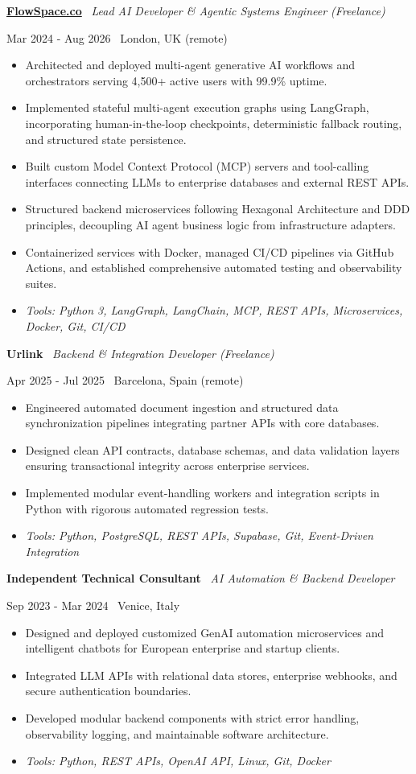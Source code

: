 \documentclass[a4paper,10pt]{article}
\newcommand{\role}[4]{%
  \vspace{2pt}\noindent
  \begin{minipage}[t]{0.70\textwidth}\raggedright\textbf{#1} \textbullet\ \textit{#3}\end{minipage}%
  \hfill
  \begin{minipage}[t]{0.28\textwidth}\raggedleft\footnotesize\color{gray}#2 \textbullet\ #4\end{minipage}%
  \vspace{1pt}%
}
\begin{document}
\role{\href{https://flowspace.co}{FlowSpace.co}}{Mar 2024 - Aug 2026}{Lead AI Developer \& Agentic Systems Engineer (Freelance)}{London, UK (remote)}
\begin{itemize}
  \item Architected and deployed multi-agent generative AI workflows and orchestrators serving 4,500+ active users with 99.9\% uptime.
  \item Implemented stateful multi-agent execution graphs using LangGraph, incorporating human-in-the-loop checkpoints, deterministic fallback routing, and structured state persistence.
  \item Built custom Model Context Protocol (MCP) servers and tool-calling interfaces connecting LLMs to enterprise databases and external REST APIs.
  \item Structured backend microservices following Hexagonal Architecture and DDD principles, decoupling AI agent business logic from infrastructure adapters.
  \item Containerized services with Docker, managed CI/CD pipelines via GitHub Actions, and established comprehensive automated testing and observability suites.
  \item \textit{Tools: Python 3, LangGraph, LangChain, MCP, REST APIs, Microservices, Docker, Git, CI/CD}
\end{itemize}

\role{Urlink}{Apr 2025 - Jul 2025}{Backend \& Integration Developer (Freelance)}{Barcelona, Spain (remote)}
\begin{itemize}
  \item Engineered automated document ingestion and structured data synchronization pipelines integrating partner APIs with core databases.
  \item Designed clean API contracts, database schemas, and data validation layers ensuring transactional integrity across enterprise services.
  \item Implemented modular event-handling workers and integration scripts in Python with rigorous automated regression tests.
  \item \textit{Tools: Python, PostgreSQL, REST APIs, Supabase, Git, Event-Driven Integration}
\end{itemize}

\role{Independent Technical Consultant}{Sep 2023 - Mar 2024}{AI Automation \& Backend Developer}{Venice, Italy}
\begin{itemize}
  \item Designed and deployed customized GenAI automation microservices and intelligent chatbots for European enterprise and startup clients.
  \item Integrated LLM APIs with relational data stores, enterprise webhooks, and secure authentication boundaries.
  \item Developed modular backend components with strict error handling, observability logging, and maintainable software architecture.
  \item \textit{Tools: Python, REST APIs, OpenAI API, Linux, Git, Docker}
\end{itemize}
\end{document}
